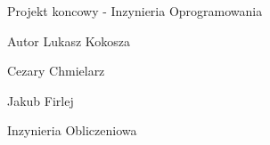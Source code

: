 Projekt koncowy -\/ Inzynieria Oprogramowania

\begin{DoxyAuthor}{Autor}
Lukasz Kokosza 

Cezary Chmielarz 

Jakub Firlej
\end{DoxyAuthor}
Inzynieria Obliczeniowa 
